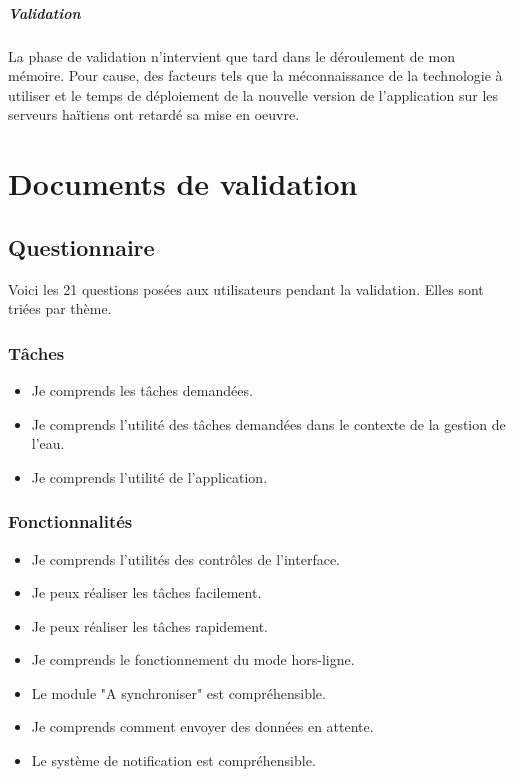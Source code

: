 \documentclass{EPL-master-thesis-covers-FR}
\begin{document}
			\paragraph*{Validation}
			La phase de validation n'intervient que tard dans le déroulement de mon mémoire. Pour cause, des facteurs tels que la méconnaissance de la technologie à utiliser et le temps de déploiement de la nouvelle version de l'application sur les serveurs haïtiens ont retardé sa mise en oeuvre.	
		
		\chapter{Documents de validation}
			\section{Questionnaire}
				Voici les 21 questions posées aux utilisateurs pendant la validation. Elles sont triées par thème.
				\subsection*{Tâches}
					\begin{itemize}
						\item Je comprends les tâches demandées.
						\item Je comprends l'utilité des tâches demandées dans le contexte de la gestion de l'eau.
						\item Je comprends l'utilité de l'application.
					\end{itemize}
					
				\subsection*{Fonctionnalités}
					\begin{itemize}
						\item Je comprends l'utilités des contrôles de l'interface.
						\item Je peux réaliser les tâches facilement.
						\item Je peux réaliser les tâches rapidement.
						\item Je comprends le fonctionnement du mode hors-ligne.
						\item Le module "A synchroniser" est compréhensible.
						\item Je comprends comment envoyer des données en attente.
						\item Le système de notification est compréhensible.
					\end{itemize}
\end{document}
